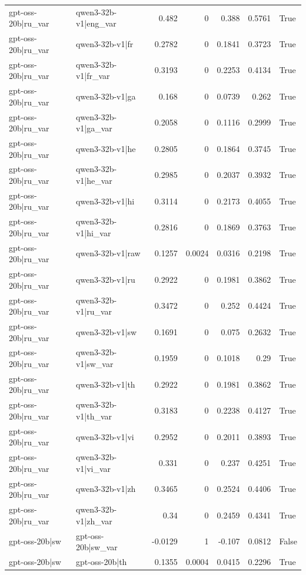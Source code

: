 \begin{table}
\begin{tabular}{l l r r r r l}
gpt-oss-20b|ru_var & qwen3-32b-v1|eng_var & 0.482 & 0 & 0.388 & 0.5761 & True \\
gpt-oss-20b|ru_var & qwen3-32b-v1|fr & 0.2782 & 0 & 0.1841 & 0.3723 & True \\
gpt-oss-20b|ru_var & qwen3-32b-v1|fr_var & 0.3193 & 0 & 0.2253 & 0.4134 & True \\
gpt-oss-20b|ru_var & qwen3-32b-v1|ga & 0.168 & 0 & 0.0739 & 0.262 & True \\
gpt-oss-20b|ru_var & qwen3-32b-v1|ga_var & 0.2058 & 0 & 0.1116 & 0.2999 & True \\
gpt-oss-20b|ru_var & qwen3-32b-v1|he & 0.2805 & 0 & 0.1864 & 0.3745 & True \\
gpt-oss-20b|ru_var & qwen3-32b-v1|he_var & 0.2985 & 0 & 0.2037 & 0.3932 & True \\
gpt-oss-20b|ru_var & qwen3-32b-v1|hi & 0.3114 & 0 & 0.2173 & 0.4055 & True \\
gpt-oss-20b|ru_var & qwen3-32b-v1|hi_var & 0.2816 & 0 & 0.1869 & 0.3763 & True \\
gpt-oss-20b|ru_var & qwen3-32b-v1|raw & 0.1257 & 0.0024 & 0.0316 & 0.2198 & True \\
gpt-oss-20b|ru_var & qwen3-32b-v1|ru & 0.2922 & 0 & 0.1981 & 0.3862 & True \\
gpt-oss-20b|ru_var & qwen3-32b-v1|ru_var & 0.3472 & 0 & 0.252 & 0.4424 & True \\
gpt-oss-20b|ru_var & qwen3-32b-v1|sw & 0.1691 & 0 & 0.075 & 0.2632 & True \\
gpt-oss-20b|ru_var & qwen3-32b-v1|sw_var & 0.1959 & 0 & 0.1018 & 0.29 & True \\
gpt-oss-20b|ru_var & qwen3-32b-v1|th & 0.2922 & 0 & 0.1981 & 0.3862 & True \\
gpt-oss-20b|ru_var & qwen3-32b-v1|th_var & 0.3183 & 0 & 0.2238 & 0.4127 & True \\
gpt-oss-20b|ru_var & qwen3-32b-v1|vi & 0.2952 & 0 & 0.2011 & 0.3893 & True \\
gpt-oss-20b|ru_var & qwen3-32b-v1|vi_var & 0.331 & 0 & 0.237 & 0.4251 & True \\
gpt-oss-20b|ru_var & qwen3-32b-v1|zh & 0.3465 & 0 & 0.2524 & 0.4406 & True \\
gpt-oss-20b|ru_var & qwen3-32b-v1|zh_var & 0.34 & 0 & 0.2459 & 0.4341 & True \\
gpt-oss-20b|sw & gpt-oss-20b|sw_var & -0.0129 & 1 & -0.107 & 0.0812 & False \\
gpt-oss-20b|sw & gpt-oss-20b|th & 0.1355 & 0.0004 & 0.0415 & 0.2296 & True \\

\end{tabular}
\end{table}
